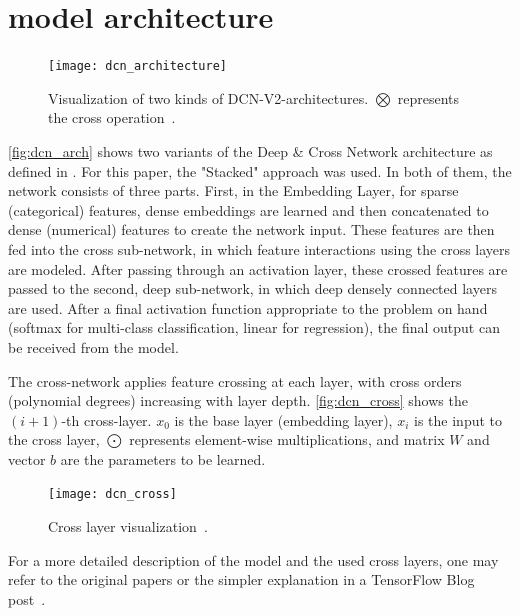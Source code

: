 \documentclass[10pt,final,journal,a4paper,oneside,twocolumn]{IEEEtran}
\begin{document}
\section{model architecture}\label{sec:model_arch}

\begin{figure}[ht]
    \centering
    \texttt{[image: dcn\_architecture]}
    \caption{Visualization of two kinds of DCN-V2-architectures. $ \bigotimes $ represents the cross operation~\cite{Wang.2021}.}
    \label{fig:dcn_arch}
\end{figure}

\autoref{fig:dcn_arch} shows two variants of the Deep \& Cross Network architecture as defined in \cite{Wang.2021}. For this paper, the "Stacked" approach was used.
In both of them, the network consists of three parts. 
First, in the Embedding Layer, for sparse (categorical) features, dense embeddings are learned and then concatenated to dense (numerical) features to create the network input. These features are then fed into the cross sub-network, in which feature interactions using the cross layers are modeled. After passing through an activation layer, these crossed features are passed to the second, deep sub-network, in which deep densely connected layers are used. After a final activation function appropriate to the problem on hand (softmax for multi-class classification, linear for regression), the final output can be received from the model.

The cross-network applies feature crossing at each layer, with cross orders (polynomial degrees) increasing with layer depth. \autoref{fig:dcn_cross} shows the $ (i+1) $-th cross-layer.
$ x_{0} $ is the base layer (embedding layer), $ x_{i} $  is the input to the cross layer, $ \bigodot $ represents element-wise multiplications, and matrix $ W $ and vector $ b $ are the parameters to be learned.

\begin{figure}[ht]
    \centering
    \texttt{[image: dcn\_cross]}
    \caption{Cross layer visualization~\cite{Wang.2021}.}
    \label{fig:dcn_cross}
\end{figure}

For a more detailed description of the model and the used cross layers, one may refer to the original papers or the simpler explanation in a TensorFlow Blog post~\cite{Wang.2020}.
\end{document}
